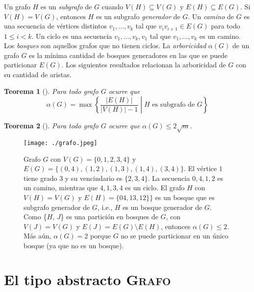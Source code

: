 \documentclass[%
    a4paper,%
    12pt,%
    twoside,%
    openright,%
    halfparskip,%
    cleardoubleempty,%
    bigheadings,%
    titlepage,%
    headsepline%
]{scrbook}
\newtheorem{theorem}{Teorema}
\newcommand{\Grafo}{\textsc{Grafo}\xspace}
\begin{document}
Un grafo $H$ es un \emph{subgrafo} de $G$ cuando $V(H) \subseteq V(G)$ y $E(H) \subseteq E(G)$.  Si $V(H) = V(G)$, entonces $H$ es un subgrafo \emph{generador} de $G$.  Un \emph{camino} de $G$ es una secuencia de vértices distintos $v_1, \ldots, v_k$ tal que $v_iv_{i+1} \in E(G)$ para todo $1 \leq i < k$.  Un ciclo es una secuencia $v_1, \ldots, v_k, v_1$ tal que $v_1, \ldots, v_k$ es un camino.  Los \emph{bosques} son aquellos grafos que no tienen ciclos.  La \emph{arboricidad} $\alpha(G)$ de un grafo $G$ es la mínima cantidad de bosques generadores en las que se puede particionar $E(G)$.  Los siguientes resultados relacionan la arboricidad de $G$ con su cantidad de aristas.

\begin{theorem}[\cite{Nash-WilliamsJLMS1964}]
  Para todo grafo $G$ ocurre que
  \[\alpha(G) = \max\left\{\frac{|E(H)|}{|V(H)|-1} \middle| H \text{ es subgrafo de }G\right\}\]
\end{theorem}

\begin{theorem}[\cite{ChibaNishizekiSJC1985}]
  Para todo grafo $G$ ocurre que $\alpha(G) \leq 2\sqrt{m}$.
\end{theorem}




\begin{figure}
  \centering
  \texttt{[image: ./grafo.jpeg]}

  \caption{Grafo $G$ con $V(G) = \{0,1,2,3,4\}$ y $E(G) =\{(0,4),(1,2),(1,3),(1,4),(3,4)\}$.  El vértice $1$ tiene grado $3$ y su vencindario es $\{2,3,4\}$. La secuencia $0, 4, 1, 2$ es un camino, mientras que $4,1,3,4$ es un ciclo.  El grafo $H$ con $V(H) = V(G)$ y $E(H) = \{04, 13, 12\}\}$ es un bosque que es subgrafo generador de $G$, i.e., $H$ es un bosque generador de $G$.  Como \{$H$, $J$\} es una partición en bosques de $G$, con $V(J) = V(G)$ y $E(J) = E(G) \setminus E(H)$, entonces $\alpha(G) \leq 2$.  Más aún, $\alpha(G) = 2$ porque $G$ no se puede particionar en un único bosque (ya que no es un bosque).}\label{fig:definiciones}
\end{figure}


\chapter{El tipo abstracto \Grafo}
\label{sec:tad grafo}

\def\lstlistingname{Pseudocódigo}
 
\end{document}
